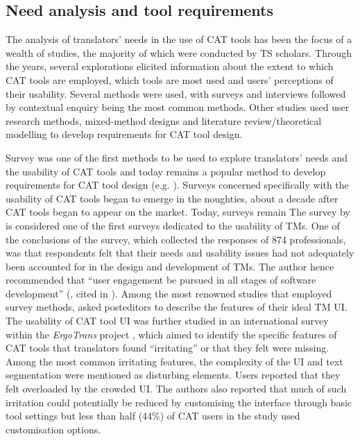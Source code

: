 \subsection{Need analysis and tool requirements}

The analysis of translators’ needs in the use of CAT tools has been the focus of a wealth of studies, the majority of which were conducted by TS scholars. Through the years, several explorations elicited information about the extent to which CAT tools are employed, which tools are most used and users’ perceptions of their usability. Several methods were used, with surveys and interviews followed by contextual enquiry being the most common methods. Other studies used user research methods, mixed-method designs and literature review/theoretical modelling to develop requirements for CAT tool design.

Survey was one of the first methods to be used to explore translators’ needs and the usability of CAT tools and today remains a popular method to develop requirements for CAT tool design (e.g. \cite{schneider2018translation}). Surveys concerned specifically with the usability of CAT tools began to emerge in the noughties, about a decade after CAT tools began to appear on the market. Today, surveys remain The survey by \citet{lagoudaki2006translation} is considered one of the first surveys dedicated to the usability of TMs. One of the conclusions of the survey, which collected the responses of 874 professionals, was that respondents felt that their needs and usability issues had not adequately been accounted for in the design and development of TMs. The author hence recommended that ``user engagement be pursued in all stages of software development'' (\citealt[205]{Lagoudaki2008}, cited in \cite{vargas2019usability}). Among the most renowned studies that employed survey methods, \citet{moorkens2013user} asked posteditors to describe the features of their ideal TM UI. The usability of CAT tool UI was further studied in an international survey within the \textit{ErgoTrans} project \citep{o2017irritating}, which aimed to identify the specific features of CAT tools that translators found ``irritating'' or that they felt were missing. Among the most common irritating features, the complexity of the UI and text segmentation were mentioned as disturbing elements. Users reported that they felt overloaded by the crowded UI. The authors also reported that much of such irritation could potentially be reduced by customising the interface through basic tool settings but less than half (44\%) of CAT users in the study used customisation options.

